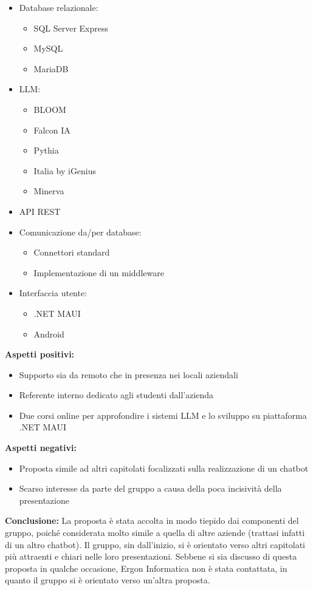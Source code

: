 \documentclass[10pt]{article}
\begin{document}
\begin{itemize}
    \item Database relazionale:
    \begin{itemize}
        \item SQL Server Express
        \item MySQL
        \item MariaDB
    \end{itemize}
    \item LLM:
    \begin{itemize}
        \item BLOOM
        \item Falcon IA
        \item Pythia
        \item Italia by iGenius
        \item Minerva
    \end{itemize}
    \item API REST
    \item Comunicazione da/per database:
    \begin{itemize}
        \item Connettori standard
        \item Implementazione di un middleware
    \end{itemize}
    \item Interfaccia utente:
    \begin{itemize}
        \item .NET MAUI
        \item Android
    \end{itemize}
\end{itemize}
\textbf{Aspetti positivi:}
\begin{itemize}
    \item Supporto sia da remoto che in presenza nei locali aziendali
    \item Referente interno dedicato agli studenti dall’azienda
    \item Due corsi online per approfondire i sistemi LLM e lo sviluppo su piattaforma .NET MAUI
\end{itemize}
\textbf{Aspetti negativi:}
\begin{itemize}
    \item Proposta simile ad altri capitolati focalizzati sulla realizzazione di un chatbot
    \item Scarso interesse da parte del gruppo a causa della poca incisività della presentazione
\end{itemize}
\textbf{Conclusione:}
La proposta è stata accolta in modo tiepido dai componenti del gruppo, poiché considerata molto simile a quella di altre aziende (trattasi infatti di un altro chatbot). Il gruppo, sin dall’inizio, si è orientato verso altri capitolati più attraenti e chiari nelle loro presentazioni. Sebbene si sia discusso di questa proposta in qualche occasione, Ergon Informatica non è stata contattata, in quanto il gruppo si è orientato verso un'altra proposta.
\end{document}
